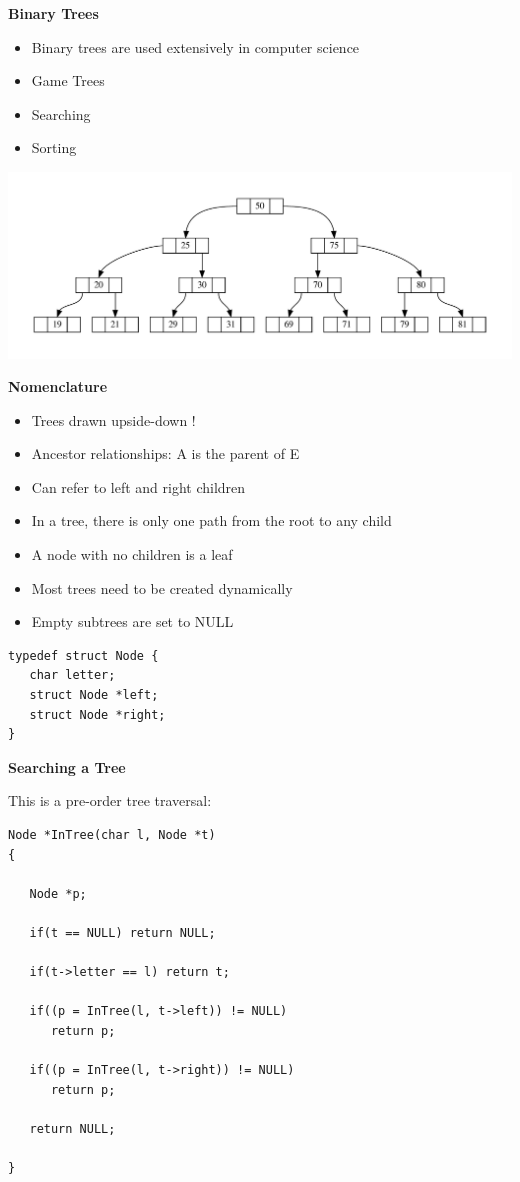 \documentclass[a4,portraitt]{slides}
\begin{document}
\newpage
{\samepage
\begin{center}
{\Large{\bf Binary Trees}}
\end{center}
\begin{itemize}
\item Binary trees are used extensively in computer science
\item Game Trees
\item Searching
\item Sorting
\end{itemize}
\begin{center}
\includegraphics[width=\textwidth]{../Images/Linkedb.pdf}
\end{center}
}

\newpage
{\samepage
\begin{center}
{\Large{\bf Nomenclature}}
\end{center}
\begin{itemize}
\item Trees drawn upside-down !
\item Ancestor relationships: A is the parent of E
\item Can refer to left and right children
\item In a tree, there is only one path from the root to any child
\item A node with no children is a leaf
\item Most trees need to be created dynamically
\item Empty subtrees are set to NULL
\end{itemize}
\begin{verbatim}
typedef struct Node {
   char letter;
   struct Node *left;
   struct Node *right;
}
\end{verbatim}
}

\newpage
{\samepage
\begin{center}
{\Large{\bf Searching a Tree}}
\end{center}
This is a pre-order tree traversal:
\begin{verbatim}
Node *InTree(char l, Node *t)
{

   Node *p;

   if(t == NULL) return NULL;

   if(t->letter == l) return t;

   if((p = InTree(l, t->left)) != NULL)
      return p;

   if((p = InTree(l, t->right)) != NULL)
      return p;

   return NULL;

}
\end{verbatim}
}
\end{document}
